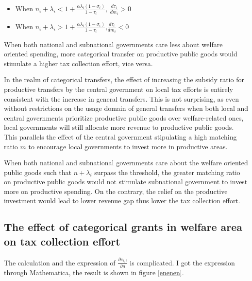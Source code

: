 \begin{itemize}
    \item When $n_i+\lambda_i<1+\frac{\alpha \lambda_i(1-\sigma_i)}{1-\tau_i}$, $\frac{d \tau_i}{d m_i}>0$
    \item When $n_i+\lambda_i>1+\frac{\alpha \lambda_i(1-\sigma_i)}{1-\tau_i}$,$\frac{d \tau_i}{d m_i}<0$
\end{itemize}

When both national and subnational governments care less about welfare oriented spending, more categorical transfer on productive public goods would stimulate a higher tax collection effort, vice versa.

In the realm of categorical transfers, the effect of increasing the subsidy ratio for productive transfers by the central government on local tax efforts is entirely consistent with the increase in general transfers. This is not surprising, as even without restrictions on the usage domain of general transfers when both local and central governments prioritize productive public goods over welfare-related ones, local governments will still allocate more revenue to productive public goods. This parallels the effect of the central government stipulating a high matching ratio $m$ to encourage local governments to invest more in productive areas.

When both national and subnational governments care about the welfare oriented public goods such that $n+\lambda_i$ surpass the threshold, the greater matching ratio on productive public goods would not stimulate subnational government to invest more on productive spending. On the contrary, the relief on the productive investment would lead to lower revenue gap thus lower the tax collection effort.

\subsection{The effect of categorical grants in welfare area on tax collection effort}
The calculation and the expression of $\frac{\partial e_{i,t}}{\partial n}$ is complicated. I got the expression through Mathematica, the result is shown in figure \ref{enenen}.

